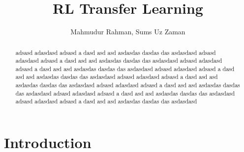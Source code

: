\documentclass[letterpaper, 11 pt, conference]{ieeeconf}  %
\title{\LARGE \bf
RL Transfer Learning
}
\author{Mahmudur Rahman, Sums Uz Zaman}
\begin{document}
\maketitle
\thispagestyle{empty}
\pagestyle{empty}


\begin{abstract}

adsasd adasdasd  adsasd a dasd asd asd asdasdas dasdas das asdasdasd adsasd adasdasd  adsasd a dasd asd asd asdasdas dasdas das asdasdasd adsasd adasdasd  adsasd a dasd asd asd asdasdas dasdas das asdasdasd adsasd adasdasd  adsasd a dasd asd asd asdasdas dasdas das asdasdasd adsasd adasdasd  adsasd a dasd asd asd asdasdas dasdas das asdasdasd adsasd adasdasd  adsasd a dasd asd asd asdasdas dasdas das asdasdasd adsasd adasdasd  adsasd a dasd asd asd asdasdas dasdas das asdasdasd adsasd adasdasd  adsasd a dasd asd asd asdasdas dasdas das asdasdasd

\end{abstract}


\section{Introduction}
\end{document}
